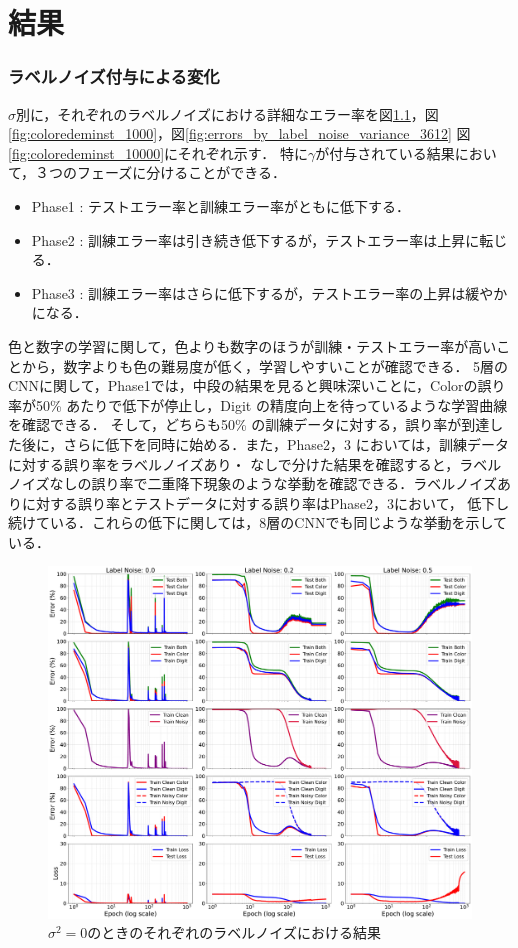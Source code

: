 \chapter{結果}
\label{chap:results}

\subsection{ラベルノイズ付与による変化}
$\sigma$別に，それぞれのラベルノイズにおける詳細なエラー率を図\ref{fig:errors_by_label_noise_variance_0}，図\ref{fig:coloredeminst_1000}，図\ref{fig:errors_by_label_noise_variance_3612}
図\ref{fig:coloredeminst_10000}にそれぞれ示す．
特に$\gamma$が付与されている結果において，３つのフェーズに分けることができる．
\begin{itemize}
    \item Phase1 : テストエラー率と訓練エラー率がともに低下する．
    \item Phase2 : 訓練エラー率は引き続き低下するが，テストエラー率は上昇に転じる．
    \item Phase3 : 訓練エラー率はさらに低下するが，テストエラー率の上昇は緩やかになる．
\end{itemize}
色と数字の学習に関して，色よりも数字のほうが訓練・テストエラー率が高いことから，数字よりも色の難易度が低く，学習しやすいことが確認できる．
5層のCNNに関して，Phase1では，中段の結果を見ると興味深いことに，Colorの誤り率が50\% あたりで低下が停止し，Digit の精度向上を待っているような学習曲線を確認できる．
そして，どちらも50\% の訓練データに対する，誤り率が到達した後に，さらに低下を同時に始める．また，Phase2，3 においては，訓練データに対する誤り率をラベルノイズあり・
なしで分けた結果を確認すると，ラベルノイズなしの誤り率で二重降下現象のような挙動を確認できる．ラベルノイズありに対する誤り率とテストデータに対する誤り率はPhase2，3において，
低下し続けている．これらの低下に関しては，8層のCNNでも同じような挙動を示している．
\begin{figure}[H]
    \centering
    \includegraphics[width=\linewidth]{fig/erroe_metrics_by_variances/error_metrics_by_label_noise_variance_0.pdf}
    \caption{$\sigma^2 = 0$のときのそれぞれのラベルノイズにおける結果}
    \label{fig:errors_by_label_noise_variance_0}
\end{figure}

